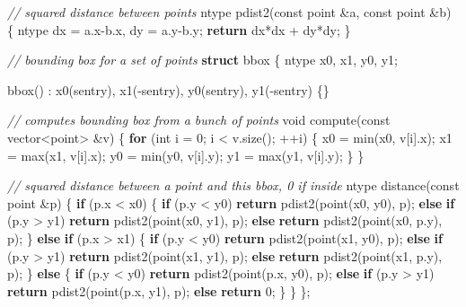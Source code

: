 \documentclass[10pt,]{article}
\newenvironment{Shaded}{}{}
\newcommand{\KeywordTok}[1]{\textcolor[rgb]{0.00,0.44,0.13}{\textbf{{#1}}}}
\newcommand{\DataTypeTok}[1]{\textcolor[rgb]{0.56,0.13,0.00}{{#1}}}
\newcommand{\DecValTok}[1]{\textcolor[rgb]{0.25,0.63,0.44}{{#1}}}
\newcommand{\CommentTok}[1]{\textcolor[rgb]{0.38,0.63,0.69}{\textit{{#1}}}}
\newcommand{\NormalTok}[1]{{#1}}
\begin{document}
\begin{Shaded}
\begin{Highlighting}[]
\CommentTok{// squared distance between points}
\NormalTok{ntype pdist2(}\DataTypeTok{const} \NormalTok{point &a, }\DataTypeTok{const} \NormalTok{point &b)}
\NormalTok{\{}
    \NormalTok{ntype dx = a.x-b.x, dy = a.y-b.y;}
    \KeywordTok{return} \NormalTok{dx*dx + dy*dy;}
\NormalTok{\}}

\CommentTok{// bounding box for a set of points}
\KeywordTok{struct} \NormalTok{bbox}
\NormalTok{\{}
    \NormalTok{ntype x0, x1, y0, y1;}
    
    \NormalTok{bbox() : x0(sentry), x1(-sentry), y0(sentry), y1(-sentry) \{\}}
    
    \CommentTok{// computes bounding box from a bunch of points}
    \DataTypeTok{void} \NormalTok{compute(}\DataTypeTok{const} \NormalTok{vector<point> &v) \{}
        \KeywordTok{for} \NormalTok{(}\DataTypeTok{int} \NormalTok{i = }\DecValTok{0}\NormalTok{; i < v.size(); ++i) \{}
            \NormalTok{x0 = min(x0, v[i].x);   x1 = max(x1, v[i].x);}
            \NormalTok{y0 = min(y0, v[i].y);   y1 = max(y1, v[i].y);}
        \NormalTok{\}}
    \NormalTok{\}}
    
    \CommentTok{// squared distance between a point and this bbox, 0 if inside}
    \NormalTok{ntype distance(}\DataTypeTok{const} \NormalTok{point &p) \{}
        \KeywordTok{if} \NormalTok{(p.x < x0) \{}
            \KeywordTok{if} \NormalTok{(p.y < y0)       }\KeywordTok{return} \NormalTok{pdist2(point(x0, y0), p);}
            \KeywordTok{else} \KeywordTok{if} \NormalTok{(p.y > y1)  }\KeywordTok{return} \NormalTok{pdist2(point(x0, y1), p);}
            \KeywordTok{else}                \KeywordTok{return} \NormalTok{pdist2(point(x0, p.y), p);}
        \NormalTok{\}}
        \KeywordTok{else} \KeywordTok{if} \NormalTok{(p.x > x1) \{}
            \KeywordTok{if} \NormalTok{(p.y < y0)       }\KeywordTok{return} \NormalTok{pdist2(point(x1, y0), p);}
            \KeywordTok{else} \KeywordTok{if} \NormalTok{(p.y > y1)  }\KeywordTok{return} \NormalTok{pdist2(point(x1, y1), p);}
            \KeywordTok{else}                \KeywordTok{return} \NormalTok{pdist2(point(x1, p.y), p);}
        \NormalTok{\}}
        \KeywordTok{else} \NormalTok{\{}
            \KeywordTok{if} \NormalTok{(p.y < y0)       }\KeywordTok{return} \NormalTok{pdist2(point(p.x, y0), p);}
            \KeywordTok{else} \KeywordTok{if} \NormalTok{(p.y > y1)  }\KeywordTok{return} \NormalTok{pdist2(point(p.x, y1), p);}
            \KeywordTok{else}                \KeywordTok{return} \DecValTok{0}\NormalTok{;}
        \NormalTok{\}}
    \NormalTok{\}}
\NormalTok{\};}


\end{Highlighting}
\end{Shaded}
\end{document}
